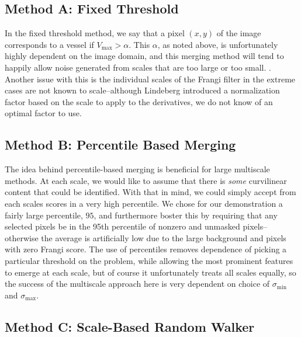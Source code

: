 \subsection{Method A: Fixed Threshold}

In the fixed threshold method, we say that a pixel $(x,y)$ of the image corresponds to a vessel if
$V_{\max} >  \alpha$. This $\alpha$, as noted above, is unfortunately highly dependent on the image domain, and this merging method will tend to happily allow noise generated from scales that are too large or too small. . Another issue with this is the individual scales of the Frangi filter in the extreme cases are not known to scale--although Lindeberg introduced a normalization factor based on the scale to apply to the derivatives, we do not know of an optimal factor to use.


\subsection{Method B: Percentile Based Merging}

The idea behind percentile-based merging is beneficial for large multiscale methods. At each scale, we would like to assume that there is \textit{some} curvilinear content that could be identified. With that in mind, we could simply accept from each scales scores in a very high percentile. We chose for our demonstration a fairly large percentile, $95$, and furthermore boster this by requiring that any selected pixels be in the 95th percentile of nonzero and unmasked pixels--otherwise the average is artificially low due to the large background and pixels with zero Frangi score. The use of percentiles removes dependence of picking a particular threshold on the problem, while allowing the most prominent features to emerge at each scale, but of course it unfortunately treats all scales equally, so the success of the multiscale approach here is very dependent on choice of $\sigma_{\min}$ and $\sigma_{\max}$.

\subsection{Method C: Scale-Based Random Walker}

